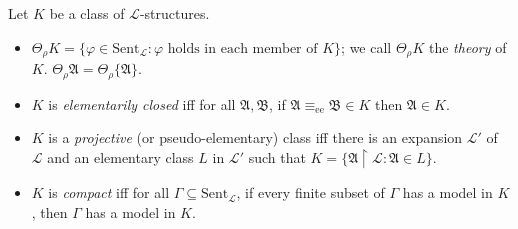 Let $K$ be a class of $\mathcal{L}$-structures.
\begin{itemize}
\item[(i)] $\Theta_{\rho}K = \{\varphi \in \text{Sent}_{\mathcal{L}} : \varphi \text{ holds in each member of } K\}$; we call $\Theta_{\rho}K$ the \textit{theory} of $K$. $\Theta_{\rho}\mathfrak{A} = \Theta_{\rho}\{\mathfrak{A}\}$.
\item[(ii)] $K$ is \textit{elementarily closed} iff for all $\mathfrak{A}, \mathfrak{B}$, if $\mathfrak{A} \equiv_{\text{ee}} \mathfrak{B} \in K$ then $\mathfrak{A} \in K$.
\item[(iii)] $K$ is a \textit{projective} (or pseudo-elementary) class iff there is an expansion $\mathcal{L}'$ of $\mathcal{L}$ and an elementary class $L$ in $\mathcal{L}'$ such that $K = \{\mathfrak{A} \upharpoonright \mathcal{L} : \mathfrak{A} \in L\}$.
\item[(iv)] $K$ is \textit{compact} iff for all $\Gamma \subseteq \text{Sent}_{\mathcal{L}}$, if every finite subset of $\Gamma$ has a model in $K$, then $\Gamma$ has a model in $K$.
\end{itemize}

